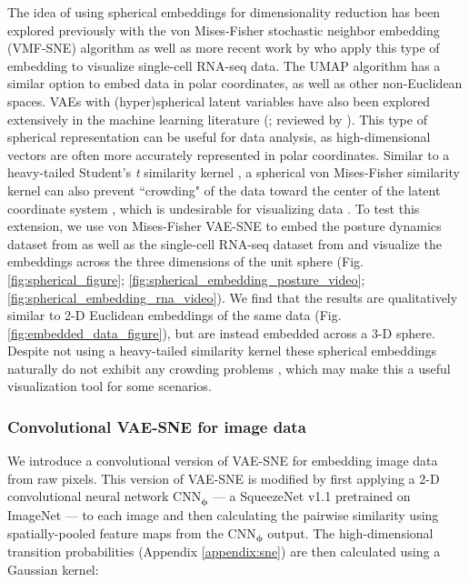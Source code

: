 \documentclass[11pt,a4paper,oneside]{book}
\begin{document}
\begin{appendices}
The idea of using spherical embeddings for dimensionality reduction has been explored previously with the von Mises-Fisher stochastic neighbor embedding (VMF-SNE) algorithm \citep{wang2016vmf} as well as more recent work by \cite{ding2019deep} who apply this type of embedding to visualize single-cell RNA-seq data. The UMAP algorithm \citep{mcinnes2018umap} has a similar option to embed data in polar coordinates, as well as other non-Euclidean spaces. VAEs with (hyper)spherical latent variables have also been explored extensively in the machine learning literature (\citealt{davidson2018hyperspherical}; reviewed by \citealt{ding2019deep}). This type of spherical representation can be useful for data analysis, as high-dimensional vectors are often more accurately represented in polar coordinates. Similar to a heavy-tailed Student's \textit{t} similarity kernel \citep{maaten2008tsne}, a spherical von Mises-Fisher similarity kernel can also prevent ``crowding" of the data toward the center of the latent coordinate system \citep{davidson2018hyperspherical, ding2019deep}, which is undesirable for visualizing data \citep{maaten2008tsne}. 
To test this extension, we use von Mises-Fisher VAE-SNE to embed the posture dynamics dataset from \cite{berman2014mapping, berman2016predictability, pereira2019fast} as well as the single-cell RNA-seq dataset from \cite{la2018rna} and visualize the embeddings across the three dimensions of the unit sphere (Fig. \ref{fig:spherical_figure}; \ref{fig:spherical_embedding_posture_video}; \ref{fig:spherical_embedding_rna_video}). We find that the results are qualitatively similar to 2-D Euclidean embeddings of the same data (Fig. \ref{fig:embedded_data_figure}), but are instead embedded across a 3-D sphere. Despite not using a heavy-tailed similarity kernel \citep{maaten2008tsne} these spherical embeddings naturally do not exhibit any crowding problems \citep{davidson2018hyperspherical, ding2019deep}, which may make this a useful visualization tool for some scenarios.


\subsubsection{Convolutional VAE-SNE for image data}
\label{appendix:conv}
We introduce a convolutional version of VAE-SNE for embedding image data from raw pixels. This version of VAE-SNE is modified by first applying a 2-D convolutional neural network $\mathrm{CNN}_{\boldsymbol{\phi}}$ --- a SqueezeNet v1.1 \citep{iandola2016squeezenet} pretrained on ImageNet \citep{deng2009imagenet} --- to each image and then calculating the pairwise similarity using spatially-pooled feature maps from the $\mathrm{CNN}_{\boldsymbol{\phi}}$ output. The high-dimensional transition probabilities (Appendix \ref{appendix:sne}) are then calculated using a Gaussian kernel:


\end{appendices}
\end{document}
